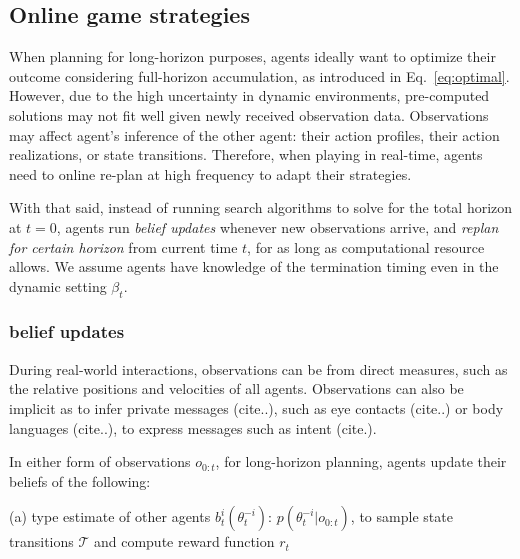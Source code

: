 \documentclass[letterpaper, 10 pt, conference]{ieeeconf}  %
\newcommand{\argmax}{\arg\!\!\max}
\begin{document}
\subsection{Online game strategies}
When planning for long-horizon purposes, agents ideally 
want to optimize their outcome considering full-horizon accumulation, as introduced in 
Eq.~\ref{eq:optimal}. However, due to the high uncertainty in dynamic 
environments, pre-computed solutions may not fit well given newly received 
observation data. Observations may affect agent's inference of the other 
agent: their action profiles, their action realizations, or state transitions. Therefore, when 
playing in real-time, agents need to online re-plan at high frequency to adapt their strategies. 

With that said, instead of running search algorithms to solve for the total 
horizon at $t=0$, agents run \textit{belief updates} whenever new 
observations arrive, and 
\textit{replan for certain horizon} from current time $t$, for as long as computational resource allows. 
We assume agents have knowledge of the termination timing even in the dynamic setting $\beta_t$. 
\subsubsection{belief updates}\label{sec:belief_update}
During real-world interactions, observations can be from direct measures, such as 
the relative positions and velocities of all agents. Observations can also 
be implicit as to infer private messages (cite..), such as eye contacts (cite..) or body 
languages (cite..), to express messages such as intent (cite.).

In either form of observations $o_{0:t}$, for long-horizon planning, agents 
update their beliefs of the following:

(a) type estimate of other agents $b^i_t(\theta_t^{-i})$: 
$p(\theta^{-i}_t|o_{0:t})$, to sample state transitions $\mathcal{T}$ and 
compute reward function $r_t$
\end{document}
